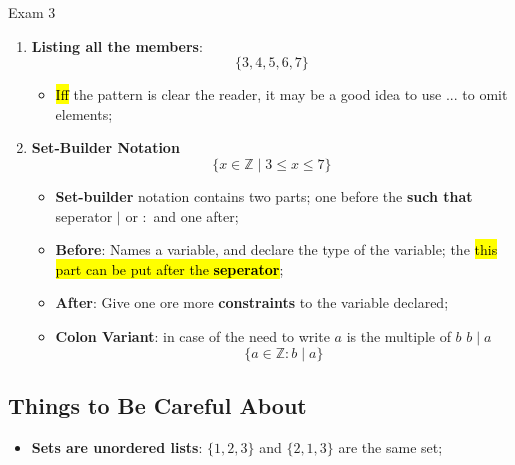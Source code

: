 \documentclass{note}
\begin{document}
\begin{note}{Exam 3}
\begin{enumerate}
            \item \textbf{Listing all the members}:
            \begin{displaymath}
                \{3, 4, 5, 6, 7\}
            \end{displaymath}
            \begin{itemize}
                \item \hl{Iff} the pattern is clear the reader, it may be a good idea to use $ ... $ to omit elements;
            \end{itemize}

            \item \textbf{Set-Builder Notation}
            \begin{displaymath}
                \{ x \in \mathbb{Z} \mid 3 \leq x \leq 7 \}
            \end{displaymath}
            \begin{itemize}
                \item \textbf{Set-builder} notation contains two parts; one before the \textbf{such that}
                seperator $ \mid $ or $ : $ and one after;

                \item \textbf{Before}: Names a variable, and declare the type of the variable;
                the \hl{this part can be put after the \textbf{seperator}};

                \item \textbf{After}: Give one ore more \textbf{constraints} to the variable declared;

                \item \textbf{Colon Variant}: in case of the need to write $ a $ is the multiple of $ b $ $ b \mid a $
                \begin{displaymath}
                    \{ a \in \mathbb{Z}: b \mid a \}
                \end{displaymath}
            \end{itemize}
        \end{enumerate}

        \subsection{Things to Be Careful About}

        \begin{itemize}
            \item \textbf{Sets are unordered lists}: $ \{ 1,2,3 \} $ and $ \{ 2,1,3 \} $ are the same set;


\end{itemize}
\end{note}
\end{document}
